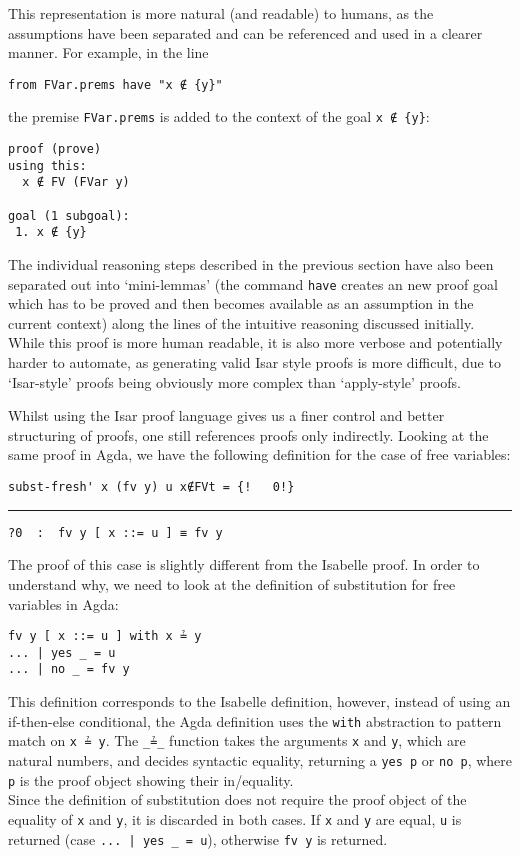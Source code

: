 \documentclass[a4paper, 12pt, twoside]{style/ociamthesis}
\theoremstyle{plain}
\theoremstyle{definition}
\theoremstyle{remark}
\begin{document}
This representation is more natural (and readable) to humans, as the
assumptions have been separated and can be referenced and used in a
clearer manner. For example, in the line

\begin{verbatim}
from FVar.prems have "x ∉ {y}"
\end{verbatim}

the premise \texttt{FVar.prems} is added to the context of the goal
\texttt{x ∉ \{y\}}:

\begin{verbatim}
proof (prove)
using this:
  x ∉ FV (FVar y)

goal (1 subgoal):
 1. x ∉ {y}
\end{verbatim}

The individual reasoning steps described in the previous section have
also been separated out into `mini-lemmas' (the command \texttt{have}
creates an new proof goal which has to be proved and then becomes
available as an assumption in the current context) along the lines of
the intuitive reasoning discussed initially. While this proof is more
human readable, it is also more verbose and potentially harder to
automate, as generating valid Isar style proofs is more difficult, due
to `Isar-style' proofs being obviously more complex than `apply-style'
proofs.

Whilst using the Isar proof language gives us a finer control and better
structuring of proofs, one still references proofs only indirectly.
Looking at the same proof in Agda, we have the following definition for
the case of free variables:

\begin{verbatim}
subst-fresh' x (fv y) u x∉FVt = {!   0!}
\end{verbatim}

\noindent\rule{8cm}{0.4pt}

\begin{verbatim}
?0  :  fv y [ x ::= u ] ≡ fv y
\end{verbatim}

The proof of this case is slightly different from the Isabelle proof. In
order to understand why, we need to look at the definition of
substitution for free variables in Agda:

\begin{verbatim}
fv y [ x ::= u ] with x ≟ y
... | yes _ = u
... | no _ = fv y
\end{verbatim}

This definition corresponds to the Isabelle definition, however, instead
of using an if-then-else conditional, the Agda definition uses the
\texttt{with} abstraction to pattern match on \texttt{x ≟ y}. The
\texttt{\_≟\_} function takes the arguments \texttt{x} and \texttt{y},
which are natural numbers, and decides syntactic equality, returning a
\texttt{yes p} or \texttt{no p}, where \texttt{p} is the proof object
showing their in/equality.\\
Since the definition of substitution does not require the proof object
of the equality of \texttt{x} and \texttt{y}, it is discarded in both
cases. If \texttt{x} and \texttt{y} are equal, \texttt{u} is returned
(case \texttt{... | yes \_ = u}), otherwise \texttt{fv y} is returned.
\end{document}
